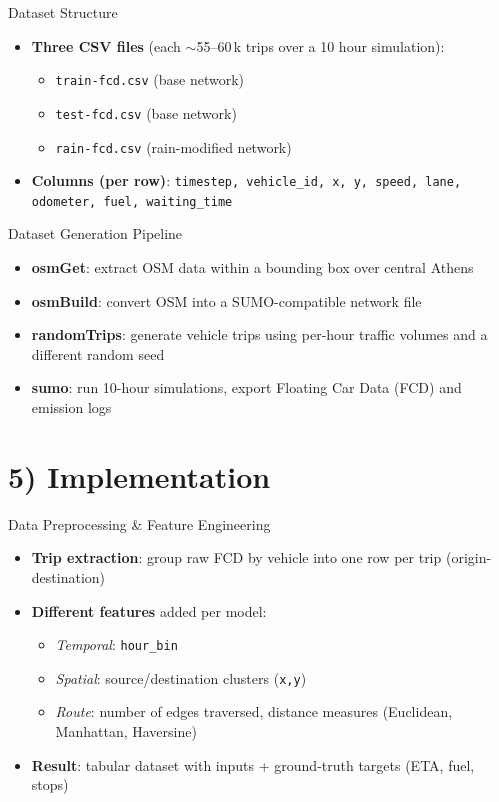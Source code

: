 \documentclass[aspectratio=169]{beamer}
\begin{document}
\begin{frame}{Dataset Structure}
\begin{itemize}
\item \textbf{Three CSV files} (each $\sim$55--60\,k trips over a 10 hour simulation):
\begin{itemize}
\item \texttt{train-fcd.csv} \quad (base network)
\item \texttt{test-fcd.csv}  \quad (base network)
\item \texttt{rain-fcd.csv}  \quad (rain-modified network)
\end{itemize}
\item \textbf{Columns (per row)}:
\texttt{timestep, vehicle\_id, x, y, speed, lane, odometer, fuel, waiting\_time}
\end{itemize}
\end{frame}

\begin{frame}{Dataset Generation Pipeline}
\begin{itemize}
\item \textbf{osmGet}: extract OSM data within a bounding box over central Athens
\item \textbf{osmBuild}: convert OSM into a SUMO-compatible network file
\item \textbf{randomTrips}: generate vehicle trips using per-hour traffic volumes and a different random seed
\item \textbf{sumo}: run 10-hour simulations, export Floating Car Data (FCD) and emission logs
\end{itemize}
\end{frame}

\section{5) Implementation}
\begin{frame}{Data Preprocessing \& Feature Engineering}
\begin{itemize}
\item \textbf{Trip extraction}: group raw FCD by vehicle into one row per trip (origin-destination)
\item \textbf{Different features} added per model:
\begin{itemize}
\item \emph{Temporal}: \texttt{hour\_bin}
\item \emph{Spatial}: source/destination clusters (\texttt{x,y})
\item \emph{Route}: number of edges traversed, distance measures (Euclidean, Manhattan, Haversine)
\end{itemize}
\item \textbf{Result}: tabular dataset with inputs + ground-truth targets (ETA, fuel, stops)
\end{itemize}
\end{frame}
\end{document}
